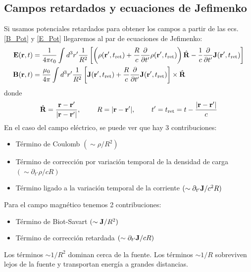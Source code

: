 \documentclass[]{article}
\numberwithin{equation}{section}
\begin{document}
\subsection{Campos retardados y ecuaciones de Jefimenko}
Si usamos potenciales retardados para obtener los campos a partir de las ecs. \ref{B_Pot} y \ref{E_Pot} llegaremos al par de ecuaciones de Jefimenko:
\begin{align}
	\n{E}(\rv,t) &= \ke \int d^3r' \frac{1}{R^2}\left[\left(\rho(\rv',t_{\mathrm{ret}}) + \frac{R}{c} \pd{}{t'}\rho(\rv',t_{\mathrm{ret}})\right)\Rhat - \frac{1}{c}\pd{}{t'}\n{J}(\rv',t_{\mathrm{ret}}) \right] \label{E_Jefimenko}\\
	\n{B}(\rv,t) &= \ku \int d^3r' \frac{1}{R^2}\left[\n{J}(\rv',t_{\mathrm{ret}}) + \frac{R}{c}\pd{}{t'}\n{J}(\rv',t_{\mathrm{ret}})\right]\times\Rhat \label{B_Jefimenko}
\end{align}
donde
\begin{equation*}
	\hat{\mathbf{R}} = \frac{\mathbf{r} - \mathbf{r}'}{|\mathbf{r} - \mathbf{r}'|}, ~~~~~~~ R = |\mathbf{r} - \mathbf{r}'|, ~~~~~~~ t' = t_{\mathrm{ret}} =  t - \frac{|\mathbf{r} - \mathbf{r}'|}{c}
\end{equation*}
En el caso del campo eléctrico, se puede ver que hay 3 contribuciones:
\begin{itemize}
	\item Término de Coulomb \((\sim \rho /R^2)\)
	\item Término de corrección por variación temporal de la densidad de carga \((\sim \partial_{t'}\rho /cR)\)
	\item Término ligado a la variación temporal de la corriente \((\sim \partial_{t'}\mathbf{J} /c^2R)\)
\end{itemize}
Para el campo magnético tenemos 2 contribuciones:
\begin{itemize}
	\item Término de Biot-Savart \((\sim \mathbf{J}/R^2)\)
	\item Término de corrección retardada \((\sim \partial_{t'}\mathbf{J}/cR)\)
\end{itemize}
Los términos \(\sim 1/R^2\) dominan cerca de la fuente. Los términos \(\sim 1/R\) sobreviven lejos de la fuente y transportan energía a grandes distancias.
\end{document}
